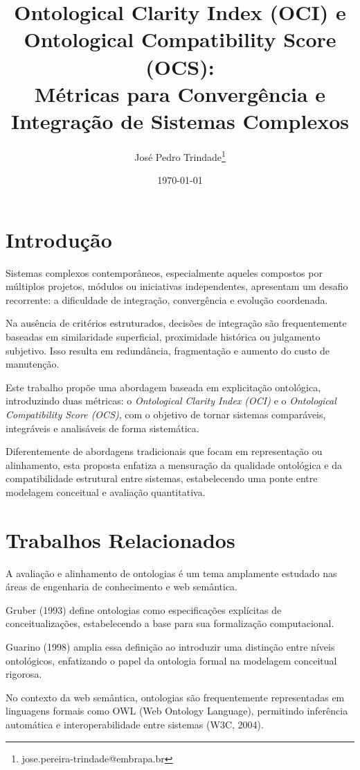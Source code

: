 \documentclass[12pt,a4paper]{article}
\title{
	Ontological Clarity Index (OCI) e Ontological Compatibility Score (OCS):\\
	Métricas para Convergência e Integração de Sistemas Complexos
}
\author{José Pedro Trindade\thanks{jose.pereira-trindade@embrapa.br}}
\date{\today}
\begin{document}
	\maketitle
	\tableofcontents



	\section{Introdução}

	Sistemas complexos contemporâneos, especialmente aqueles compostos por múltiplos projetos, módulos ou iniciativas independentes, apresentam um desafio recorrente: a dificuldade de integração, convergência e evolução coordenada.

	Na ausência de critérios estruturados, decisões de integração são frequentemente baseadas em similaridade superficial, proximidade histórica ou julgamento subjetivo. Isso resulta em redundância, fragmentação e aumento do custo de manutenção.

	Este trabalho propõe uma abordagem baseada em explicitação ontológica, introduzindo duas métricas: o \textit{Ontological Clarity Index (OCI)} e o \textit{Ontological Compatibility Score (OCS)}, com o objetivo de tornar sistemas comparáveis, integráveis e analisáveis de forma sistemática.

Diferentemente de abordagens tradicionais que focam em representação ou alinhamento, esta proposta enfatiza a mensuração da qualidade ontológica e da compatibilidade estrutural entre sistemas, estabelecendo uma ponte entre modelagem conceitual e avaliação quantitativa.

\section{Trabalhos Relacionados}

A avaliação e alinhamento de ontologias é um tema amplamente estudado nas áreas de engenharia de conhecimento e web semântica.

Gruber (1993) define ontologias como especificações explícitas de conceitualizações, estabelecendo a base para sua formalização computacional.

Guarino (1998) amplia essa definição ao introduzir uma distinção entre níveis ontológicos, enfatizando o papel da ontologia formal na modelagem conceitual rigorosa.

No contexto da web semântica, ontologias são frequentemente representadas em linguagens formais como OWL (Web Ontology Language), permitindo inferência automática e interoperabilidade entre sistemas (W3C, 2004).
\end{document}
